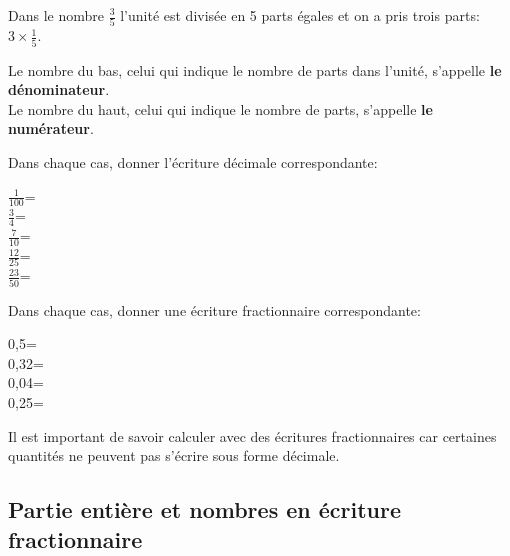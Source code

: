 \begin{methode*1}
	\begin{exemple*1}
\vspace{0.5cm}	
	
Dans le nombre $\frac{3}{5}$ l'unité est divisée en 5 parts égales et on a pris trois parts: $3\times \frac{1}{5}$.
\begin{center}
\end{center}

Le nombre du bas, celui qui indique le nombre de parts dans l'unité, s'appelle \textbf{\textcolor{C2}{le dénominateur}}.\\
Le nombre du haut, celui qui indique le nombre de parts, s'appelle \textbf{\textcolor{C2}{le numérateur}}.
\end{exemple*1}

\exercice

Dans chaque cas, donner l'écriture décimale correspondante:

$\frac{1}{100}$=\dotfill \\
$\frac{3}{4}$=\dotfill \\
$\frac{7}{10}$=\dotfill \\
$\frac{12}{25}$=\dotfill \\
$\frac{23}{50}$=\dotfill

\exercice

Dans chaque cas, donner une écriture fractionnaire correspondante:

0,5=\dotfill \\
0,32=\dotfill \\
0,04=\dotfill \\
0,25=\dotfill

\end{methode*1}

\begin{remarque}
Il est important de savoir calculer avec des écritures fractionnaires car certaines quantités ne peuvent pas s'écrire sous forme décimale.\end{remarque}

		\subsection{Partie entière et nombres en écriture fractionnaire}

